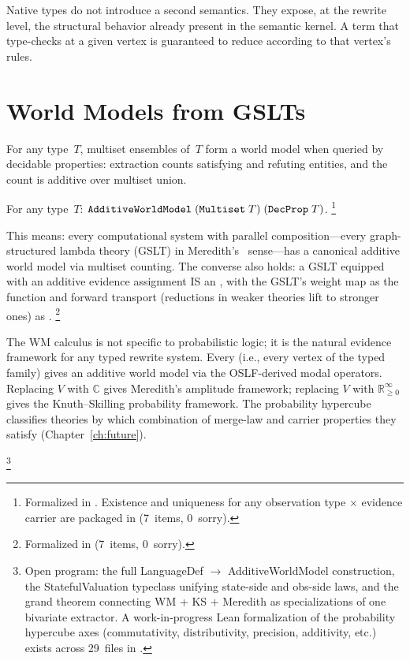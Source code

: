 \documentclass[11pt,openany]{report}
\begin{document}
Native types do not introduce a second semantics.  They expose, at
the rewrite level, the structural behavior already present in the
semantic kernel.  A term that type-checks at a given vertex is
guaranteed to reduce according to that vertex's rules.


\section{World Models from GSLTs}
\label{sec:gslt-wm}
\label{sec:gslt-open-program}

For any type~$T$, multiset ensembles of~$T$ form a world model when
queried by decidable properties: extraction counts satisfying and
refuting entities, and the count is additive over multiset union.

\begin{theorem}
For any type~$T$:
$\texttt{AdditiveWorldModel}\;(\texttt{Multiset}\;T)\;(\texttt{DecProp}\;T)$.%
\footnote{Formalized in
.
Existence and uniqueness for any observation type $\times$
evidence carrier are packaged in
(7~items, 0~sorry).}
\end{theorem}

\noindent
This means: every computational system with parallel
composition---every graph-structured lambda theory (GSLT) in
Meredith's~\cite{meredith2026ccc} sense---has a canonical additive
world model via multiset counting.  The converse also holds: a
GSLT equipped with an additive evidence assignment IS an
, with the GSLT's weight map as the
 function and forward transport (reductions in
weaker theories lift to stronger ones) as .%
\footnote{Formalized in
(7~items, 0~sorry).}

\begin{conjecture}
The WM calculus is not specific to probabilistic logic; it is the
natural evidence framework for any typed rewrite system.  Every
 (i.e., every vertex
of the typed family) gives an additive world model via the
OSLF-derived modal operators.  Replacing $V$ with $\mathbb{C}$ gives
Meredith's amplitude framework; replacing $V$ with
$\mathbb{R}_{\ge 0}^\infty$ gives the Knuth--Skilling probability
framework.  The probability
hypercube~\cite{StayWells2026} classifies theories by which
combination of merge-law and carrier properties they satisfy
(Chapter~\ref{ch:future}).
\end{conjecture}
%
\footnote{Open program: the full LanguageDef $\to$ AdditiveWorldModel
construction, the StatefulValuation typeclass unifying state-side and
obs-side laws, and the grand theorem connecting WM + KS + Meredith as
specializations of one bivariate extractor.  A work-in-progress Lean formalization
of the probability hypercube axes (commutativity, distributivity,
precision, additivity, etc.) exists across 29~files in
.}
\end{document}
